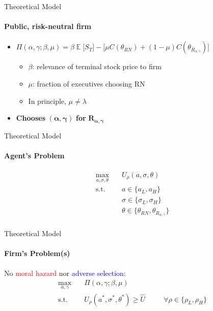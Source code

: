 \documentclass[compress]{beamer}
\DeclareMathOperator{\EX}{\mathbb{E}}%
\begin{document}
\begin{frame}{Theoretical Model}
    \framesubtitle{Public, risk-neutral firm}
    \begin{itemize}
        \item $ \Pi (\alpha, \gamma; \beta, \mu) = \beta \EX \Big[ S_T \Big] - \Big[ \mu C(\theta_{RN}) + (1-\mu) C(\theta_{R_{\alpha, \gamma}}) \Big]$ 
        \begin{itemize}
            \item $\beta$: relevance of terminal stock price to firm
            \item $\mu$: fraction of executives choosing RN
            \item In principle, $\mu \ne \lambda$
        \end{itemize}
        \vspace*{10pt}
        \pause
        \item \textbf{Chooses} $\boldsymbol{(\alpha, \gamma)}$ \textbf{for} $\boldsymbol{R_{\alpha, \gamma}}$
    \end{itemize}
\end{frame}

\begin{frame}{Theoretical Model}
    \framesubtitle{Agent's Problem}

    \begin{equation*}
        \begin{aligned}
        \max_{a, \sigma, \theta} \quad & U_\rho (a, \sigma, \theta) \\
        \textrm{s.t.}       \quad & a \in \{ a_L, a_H \} \\
                            \quad & \sigma \in \{ \sigma_L, \sigma_H \} \\
                            \quad & \theta \in \{\theta_{RN}, \theta_{R_{\alpha, \gamma}} \} \\
        \end{aligned}
    \end{equation*}
\end{frame}

\begin{frame}{Theoretical Model}
    \framesubtitle{Firm's Problem(s)}
    No \textcolor{red}{moral hazard} nor \textcolor{blue}{adverse selection}: \\

    \begin{equation*}
        \begin{alignedat}{2}
            \max_{\alpha, \gamma} \quad & \Pi (\alpha, \gamma; \beta, \mu) \\
            \textrm{s.t.}       \quad & U_{\rho}(a^*, \sigma^*, \theta^*) \ge \hat{U} & \quad & \forall \rho \in \{ \rho_L, \rho_H \}\\
        \end{alignedat}
    \end{equation*}

\end{frame}
\end{document}
